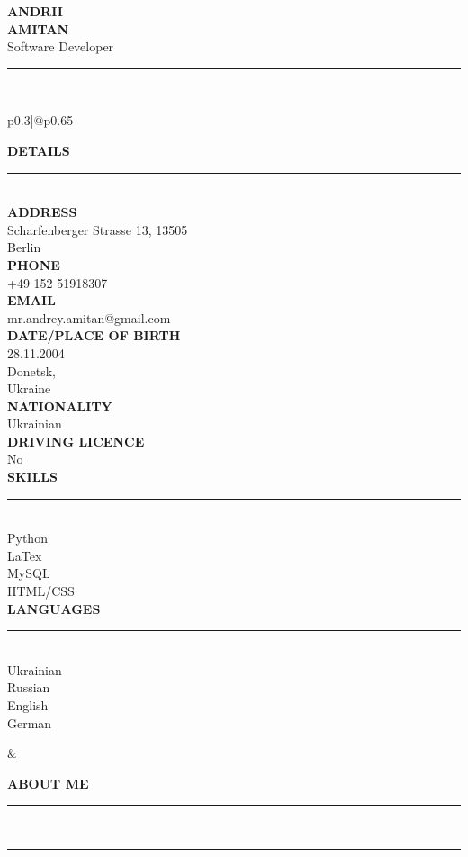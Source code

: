\documentclass[12pt,a4paper]{article}
\newcommand{\myname}[1]{\textbf{\Huge\selectfont\MakeUppercase{#1}}\\}
\newcommand{\myjobtitle}[1]{{\large #1}\\}
\newcommand{\myline}[1]{\rule{#1}{1.0pt}\\}
\newcommand{\topic}[1]{\textbf{\Large\selectfont\MakeUppercase{#1}}\\\vspace{-0.5cm}\myline{1.0cm}}
\newcommand{\uppersubtopic}[1]{\textbf{\normalsize\selectfont\MakeUppercase{#1}}\\}
\begin{document}
\begin{flushleft}
  \myname{ANDRII} %
  \myname{AMITAN} %
  \myjobtitle{Software Developer} %
   \textcolor{gray!50}{\rule{\linewidth}{1pt}}\\
\end{flushleft}

\vspace{-1.25cm} %
\begin{multicols}{2}
\setlength{\arrayrulewidth}{1pt} %

\noindent\begin{tabular}{p{0.3\textwidth}|@{\hspace{5mm}}p{0.65\textwidth}}

{
\begin{flushleft}
\topic{DETAILS}
\uppersubtopic{address} 
Scharfenberger Strasse 13, 13505\\
Berlin\\
\uppersubtopic{phone}
+49 152 51918307\\ %
\uppersubtopic{email}
mr.andrey.amitan@gmail.com\\ %
\uppersubtopic{Date/Place of Birth}
28.11.2004\\ %
Donetsk,\\
Ukraine\\
\uppersubtopic{Nationality}
Ukrainian\\
\uppersubtopic{Driving Licence}
No\\
\topic{skills} %
Python\\
LaTex\\
MySQL\\
HTML/CSS\\
\topic{Languages}
Ukrainian\\
Russian\\
English\\
German\\
\end{flushleft}
}
&
{
\begin{flushleft}
    \topic{About me} %
    
    
     \textcolor{gray!50}{\rule{\linewidth}{0.5pt}}\\
     

\end{flushleft}}
\end{tabular}
\end{multicols}
\end{document}
